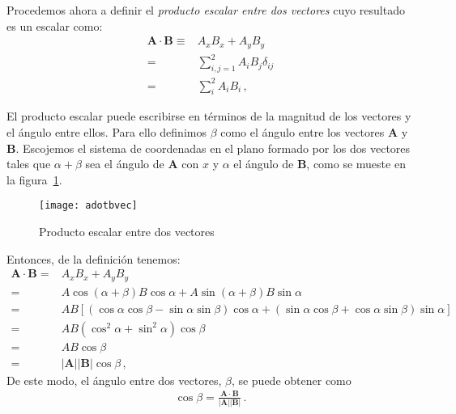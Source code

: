 \begin{frame}
Procedemos ahora a definir el \emph{producto escalar entre dos vectores} cuyo resultado es un escalar como:
\begin{align}
  \mathbf{A}\cdot\mathbf{B}\equiv&A_xB_x+A_yB_y\nonumber\\
  =&\sum_{i,j=1}^2A_iB_j\delta_{ij}\nonumber\\
  =&\sum_{i}^2A_iB_i\,,
\end{align}

El producto escalar puede escribirse en términos de la magnitud de los
vectores y el ángulo entre ellos. Para ello definimos $\beta$ como el
\'angulo entre los vectores $\mathbf{A}$ y $\mathbf{B}$. Escojemos el
sistema de coordenadas en el plano formado por los dos vectores tales
que $\alpha+\beta$ sea el \'angulo de $\mathbf{A}$ con $x$ y $\alpha$
el \'angulo de $\mathbf{B}$, como se mueste en la figura~\ref{fig:adotbvec}. 

\begin{figure}
  \centering
  \texttt{[image: adotbvec]}
  \caption{Producto escalar entre dos vectores}
  \label{fig:adotbvec}
\end{figure}

Entonces, de la definici\'on tenemos:
\begin{align}
    \mathbf{A}\cdot\mathbf{B}=&A_xB_x+A_yB_y\nonumber\\
    =&A\cos(\alpha+\beta)B\cos\alpha+A\sin(\alpha+\beta)B\sin\alpha\nonumber\\
    =&AB[(\cos\alpha\cos\beta-\sin\alpha\sin\beta)\cos\alpha+(\sin\alpha\cos\beta+\cos\alpha\sin\beta)\sin\alpha]\nonumber\\
    =&AB(\cos^2\alpha+\sin^2\alpha)\cos\beta\nonumber\\
    =&AB\cos\beta\nonumber\\
    =&|\mathbf{A}||\mathbf{B}|\cos\beta\,,
\end{align}
De este modo, el \'angulo entre dos vectores,
$\beta$, se puede obtener como
\begin{align}
  \cos\beta=\frac{\mathbf{A}\cdot\mathbf{B}}{|\mathbf{A}||\mathbf{B}|}\,.
\end{align}
\end{frame}

